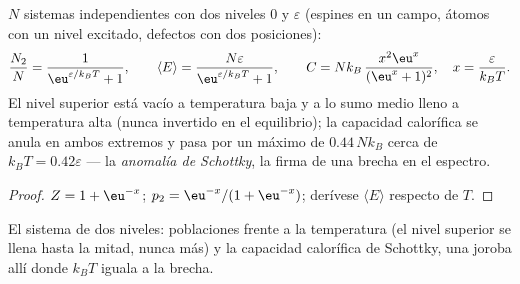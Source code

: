 \begin{proposition}\label{prop:b2:boltzmann-factor:twolevel}
$N$ sistemas independientes con dos niveles $0$ y $\varepsilon$ (espines en un
campo, átomos con un nivel excitado, defectos con dos posiciones):
\[
\frac{N_2}{N} = \frac{1}{\eu^{\varepsilon/k_BT} + 1}, \qquad
\langle E\rangle = \frac{N\varepsilon}{\eu^{\varepsilon/k_BT} + 1}, \qquad
C = Nk_B\,\frac{x^2\eu^x}{(\eu^x + 1)^2}, \quad x = \frac{\varepsilon}{k_BT} .
\]
El nivel superior está vacío a temperatura baja y a lo sumo medio lleno a
temperatura alta (nunca invertido en el equilibrio); la capacidad calorífica
se anula en ambos extremos y pasa por un máximo de $0.44\,Nk_B$ cerca de $k_BT = 0.42
\varepsilon$ --- la \emph{anomalía de Schottky}, la
firma de una brecha en el espectro.
\end{proposition}

\begin{proof}
$Z = 1 + \eu^{-x}$; $p_2 = \eu^{-x}/(1 + \eu^{-x})$; derívese $\langle
E\rangle$ respecto de $T$.
\end{proof}

\begin{omfigure}

{\small El sistema de dos niveles: poblaciones frente a la temperatura (el
nivel superior se llena hasta la mitad, nunca más) y la capacidad calorífica
de Schottky, una joroba allí donde $k_BT$ iguala a la brecha.}
\end{omfigure}

